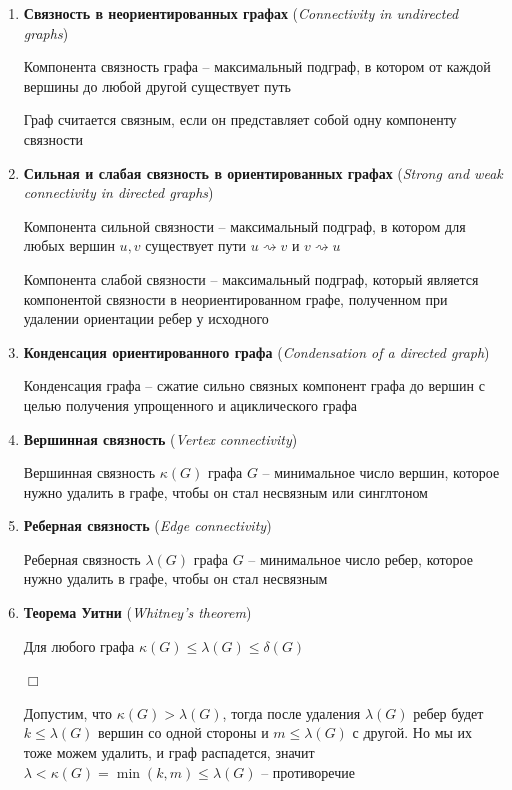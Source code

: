 \documentclass[12pt]{article}
\begin{document}
\begin{enumerate}
        \item \textbf{Связность в неориентированных графах} (\textit{Connectivity in undirected graphs})

        Компонента связность графа -- максимальный подграф, в котором от каждой вершины до любой другой существует путь

        Граф считается связным, если он представляет собой одну компоненту связности

        \item \textbf{Сильная и слабая связность в ориентированных графах} (\textit{Strong and weak connectivity in directed graphs})

        Компонента сильной связности -- максимальный подграф, в котором для любых вершин $u, v$ существует пути $u \rightsquigarrow v$ и $v \rightsquigarrow u$

        Компонента слабой связности -- максимальный подграф, который является компонентой связности в неориентированном графе, полученном при удалении ориентации ребер у исходного


        \item \textbf{Конденсация ориентированного графа} (\textit{Condensation of a directed graph})

        Конденсация графа -- сжатие сильно связных компонент графа до вершин с целью получения упрощенного и ациклического графа

        \item \textbf{Вершинная связность} (\textit{Vertex connectivity})

        Вершинная связность $\kappa(G)$ графа $G$ -- минимальное число вершин, которое нужно удалить в графе, чтобы он стал несвязным или синглтоном

        \item \textbf{Реберная связность} (\textit{Edge connectivity})

        Реберная связность $\lambda(G)$ графа $G$ -- минимальное число ребер, которое нужно удалить в графе, чтобы он стал несвязным

        \item \textbf{Теорема Уитни} (\textit{Whitney's theorem})

        Для любого графа $\kappa(G) \leq \lambda(G) \leq \delta(G)$

        $\Box$

        Допустим, что $\kappa(G) > \lambda(G)$, тогда после удаления $\lambda(G)$ ребер будет $k \leq \lambda(G)$ вершин со одной стороны и $m \leq \lambda(G)$ с другой.
        Но мы их тоже можем удалить, и граф распадется, значит $\lambda < \kappa(G) = \min (k, m) \leq \lambda(G)$ -- противоречие


\end{enumerate}
\end{document}
